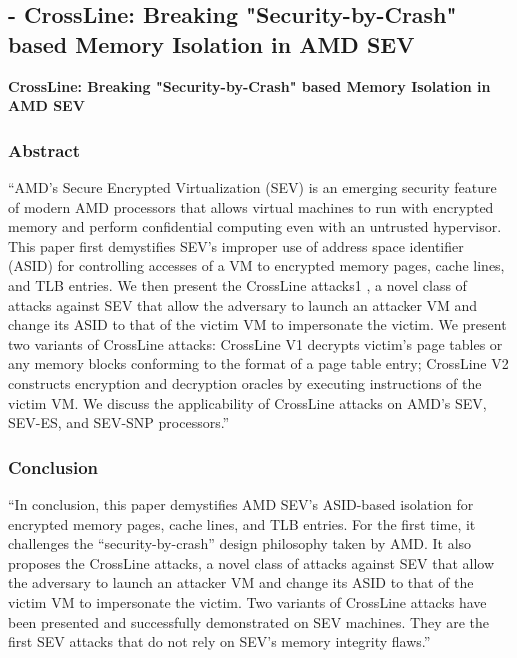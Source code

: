 
\subsection{\cite{li_crossline_2021} - CrossLine: Breaking "Security-by-Crash" based Memory Isolation in AMD SEV}

\textbf{CrossLine: Breaking "Security-by-Crash" based Memory Isolation in AMD SEV} 

\subsubsection*{Abstract \cite{li_crossline_2021}}
“AMD’s Secure Encrypted Virtualization (SEV) is an emerging security feature of modern AMD processors that allows virtual machines to run with encrypted memory and perform confidential computing even with an untrusted hypervisor. This paper first demystifies SEV’s improper use of address space identifier (ASID) for controlling accesses of a VM to encrypted memory pages, cache lines, and TLB entries. We then present the CrossLine attacks1 , a n{}ovel class of attacks against SEV that allow the adversary to launch an attacker VM and change its ASID to that of the victim VM to impersonate the victim. We present two variants of CrossLine attacks: CrossLine V1 decrypts victim’s page tables or any memory blocks conforming to the format of a page table entry; CrossLine V2 constructs encryption and decryption oracles by executing instructions of the victim VM. We discuss the applicability of CrossLine attacks on AMD’s SEV, SEV-ES, and SEV-SNP processors.”

\subsubsection*{Conclusion \cite{li_crossline_2021}}
“In conclusion, this paper demystifies AMD SEV’s ASID-based isolation for encrypted memory pages, cache lines, and TLB entries. For the first time, it challenges the “security-by-crash” design philosophy taken by AMD. It also proposes the CrossLine attacks, a novel class of attacks against SEV that allow the adversary to launch an attacker VM and change its ASID to that of the victim VM to impersonate the victim. Two variants of CrossLine attacks have been presented and successfully demonstrated on SEV machines. They are the first SEV attacks that do not rely on SEV’s memory integrity flaws.” 


